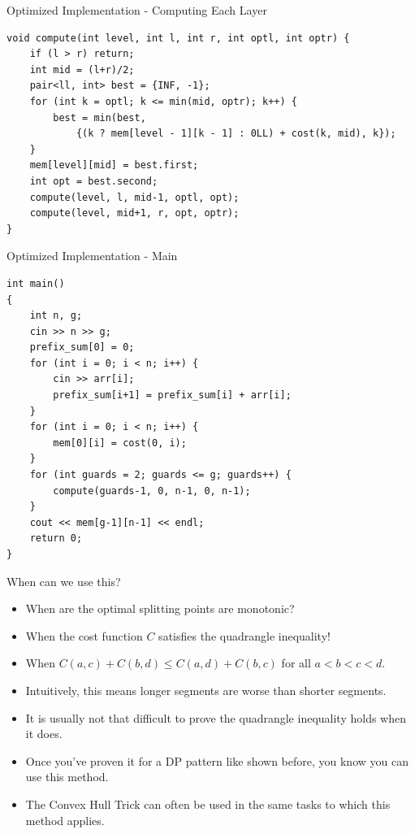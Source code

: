 \documentclass{beamer}
\begin{document}
\begin{frame}{Optimized Implementation - Computing Each Layer}
    \begin{scriptsize}
        \begin{verbatim}           
void compute(int level, int l, int r, int optl, int optr) {
    if (l > r) return;
    int mid = (l+r)/2;
    pair<ll, int> best = {INF, -1};
    for (int k = optl; k <= min(mid, optr); k++) {
        best = min(best,
            {(k ? mem[level - 1][k - 1] : 0LL) + cost(k, mid), k});
    }
    mem[level][mid] = best.first;
    int opt = best.second;
    compute(level, l, mid-1, optl, opt);
    compute(level, mid+1, r, opt, optr);
}
        \end{verbatim}
    \end{scriptsize}
\end{frame}

\begin{frame}{Optimized Implementation - Main}
    \begin{scriptsize}
        \begin{verbatim}           
int main()
{
    int n, g;
    cin >> n >> g;
    prefix_sum[0] = 0;
    for (int i = 0; i < n; i++) {
        cin >> arr[i];
        prefix_sum[i+1] = prefix_sum[i] + arr[i];
    }
    for (int i = 0; i < n; i++) {
        mem[0][i] = cost(0, i);
    }
    for (int guards = 2; guards <= g; guards++) {
        compute(guards-1, 0, n-1, 0, n-1);
    }
    cout << mem[g-1][n-1] << endl;
    return 0;
}
        \end{verbatim}
    \end{scriptsize}
\end{frame}

\begin{frame}[plain]{When can we use this?}
    \begin{itemize}
        \item<1-> When are the optimal splitting points are monotonic?
        \item<2-> When the cost function $C$ satisfies the quadrangle inequality!
        \item<3-> When $C(a, c) + C(b, d) \leq C(a, d) + C(b, c)$ for all $a < b < c < d$.
        \item<4-> Intuitively, this means longer segments are worse than shorter segments.
        \item<5-> It is usually not that difficult to prove the quadrangle inequality holds when it does.
        \item<6-> Once you've proven it for a DP pattern like shown before, you know you can use this method.
        \item<7-> The Convex Hull Trick can often be used in the same tasks to which this method applies.
    \end{itemize}
\end{frame}
\end{document}
